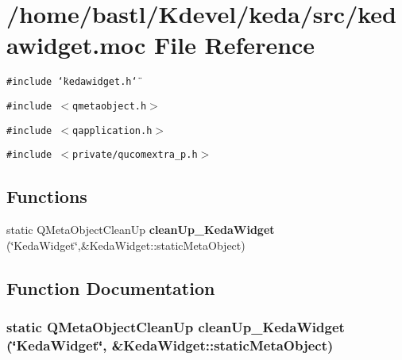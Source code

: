 \section{/home/bastl/Kdevel/keda/src/kedawidget.moc File Reference}
\label{kedawidget_8moc}
{\tt \#include \char`\"{}kedawidget.h\char`\"{}}\par
{\tt \#include $<$qmetaobject.h$>$}\par
{\tt \#include $<$qapplication.h$>$}\par
{\tt \#include $<$private/qucomextra\_\-p.h$>$}\par
\subsection*{Functions}
\begin{CompactItemize}
\item 
static QMeta\-Object\-Clean\-Up {\bf clean\-Up\_\-Keda\-Widget} (\char`\"{}Keda\-Widget\char`\"{},\&Keda\-Widget::static\-Meta\-Object)
\end{CompactItemize}


\subsection{Function Documentation}
\subsubsection{\setlength{\rightskip}{0pt plus 5cm}static QMeta\-Object\-Clean\-Up clean\-Up\_\-Keda\-Widget (\char`\"{}Keda\-Widget\char`\"{}, \&Keda\-Widget::static\-Meta\-Object)\hspace{0.3cm}{\tt  [static]}}\label{kedawidget_8moc_089aedc4160ec38046efb7d04731698c}


